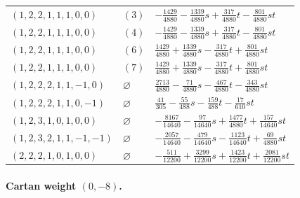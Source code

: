 \begin{longtable}{@{}lll@{}}
$(1,2,2,1,1,1,0,0)$ & $(3)$ & $-\frac{1429}{4880}-\frac{1339}{4880}s+\allowbreak \frac{317}{4880}t-\frac{801}{4880}st$\\
$(1,2,2,1,1,1,0,0)$ & $(4)$ & $-\frac{1429}{4880}-\frac{1339}{4880}s+\allowbreak \frac{317}{4880}t-\frac{801}{4880}st$\\
$(1,2,2,1,1,1,0,0)$ & $(6)$ & $\frac{1429}{4880}+\allowbreak \frac{1339}{4880}s-\frac{317}{4880}t+\allowbreak \frac{801}{4880}st$\\
$(1,2,2,1,1,1,0,0)$ & $(7)$ & $\frac{1429}{4880}+\allowbreak \frac{1339}{4880}s-\frac{317}{4880}t+\allowbreak \frac{801}{4880}st$\\
$(1,2,2,2,1,1,-1,0)$ & $\varnothing$ & $\frac{2713}{4880}-\frac{71}{4880}s-\frac{467}{4880}t-\frac{343}{4880}st$\\
$(1,2,2,2,1,1,0,-1)$ & $\varnothing$ & $\frac{41}{305}-\frac{55}{488}s-\frac{159}{488}t-\frac{17}{610}st$\\
$(1,2,3,1,0,1,0,0)$ & $\varnothing$ & $-\frac{8167}{14640}-\frac{97}{14640}s+\allowbreak \frac{1477}{4880}t+\allowbreak \frac{157}{14640}st$\\
$(1,2,3,2,1,1,-1,-1)$ & $\varnothing$ & $-\frac{2057}{14640}-\frac{479}{14640}s-\frac{1123}{14640}t+\allowbreak \frac{69}{4880}st$\\
$(2,2,2,1,0,1,0,0)$ & $\varnothing$ & $-\frac{511}{12200}+\allowbreak \frac{3299}{12200}s+\allowbreak \frac{1423}{12200}t+\allowbreak \frac{2081}{12200}st$\\
\end{longtable}
\endgroup
\paragraph{Cartan weight $(0,-8)$.}

